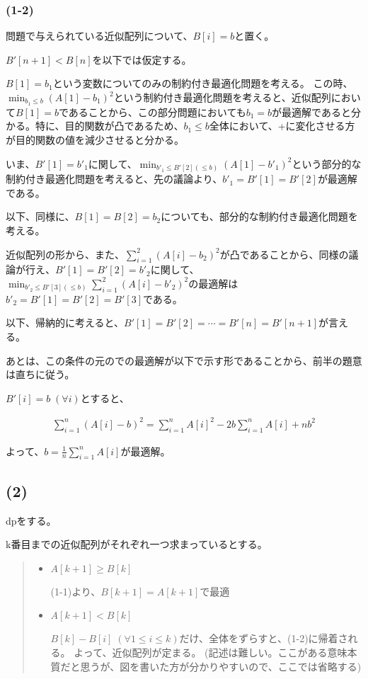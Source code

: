 \documentclass[a4paper, 10pt, dvipdfmx]{jlreq}
\begin{document}
\subsubsection*{(1-2)}

問題で与えられている近似配列について、$B[i]=b$と置く。

$B'[n+1]<B[n]$を以下では仮定する。

$B[1]=b_1$という変数についてのみの制約付き最適化問題を考える。
この時、$\min_{b_1\leq b}(A[1]-b_1)^2$という制約付き最適化問題を考えると、近似配列において$B[1]=b$であることから、この部分問題においても$b_1=b$が最適解であると分かる。特に、目的関数が凸であるため、$b_1 \leq b$全体において、+に変化させる方が目的関数の値を減少させると分かる。

いま、$B'[1]=b'_1$に関して、$\min_{b'_1 \leq B'[2] (\leq b)}(A[1]-b'_1)^2$という部分的な制約付き最適化問題を考えると、先の議論より、$b'_1=B'[1]=B'[2]$が最適解である。

以下、同様に、$B[1]=B[2]=b_2$についても、部分的な制約付き最適化問題を考える。

近似配列の形から、また、$\sum_{i=1}^{2}(A[i]-b_2)^2$が凸であることから、同様の議論が行え、$B'[1]=B'[2]=b'_2$に関して、$\min_{b'_2\leq B'[3](\leq b)}\sum_{i=1}^{2}(A[i]-b'_2)^2$の最適解は$b'_2=B'[1]=B'[2]=B'[3]$である。

以下、帰納的に考えると、$B'[1]=B'[2]=\cdots=B'[n]=B'[n+1]$が言える。

あとは、この条件の元のでの最適解が以下で示す形であることから、前半の題意は直ちに従う。

$B'[i]=b \; (\forall i)$とすると、

\begin{align*}
  \sum_{i=1}^{n}{(A[i]-b)^2} = \sum_{i=1}^{n}{A[i]^2} -2b \sum_{i=1}^{n}{A[i]} + nb^2
\end{align*}

よって、$b=\frac{1}{n}\sum_{i=1}^{n}{A[i]}$が最適解。

\subsection*{(2)}

dpをする。

k番目までの近似配列がそれぞれ一つ求まっているとする。

\begin{quote}
  \begin{itemize}
    \item  $A[k+1] \geq B[k]$

          (1-1)より、$B[k+1]=A[k+1]$で最適

    \item  $A[k+1] < B[k]$

          $B[k]-B[i] \; (\forall 1 \leq i \leq k)$だけ、全体をずらすと、(1-2)に帰着される。
          よって、近似配列が定まる。
          (記述は難しい。ここがある意味本質だと思うが、図を書いた方が分かりやすいので、ここでは省略する)
  \end{itemize}
\end{quote}
\end{document}
